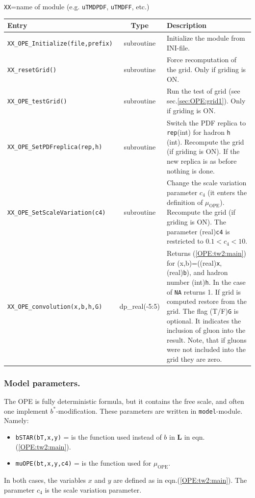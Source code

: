 \documentclass[prd,nofootinbib,eqsecnum,final]{revtex4}
\renewcommand{\(}{\left(}
\renewcommand{\)}{\right)}
\renewcommand{\[}{\left[}
\renewcommand{\]}{\right]}
\begin{document}
\begin{center}
\texttt{XX}=name of module (e.g. \texttt{uTMDPDF}, \texttt{uTMDFF}, etc.)
\\
\begin{tabular}{||p{5.5cm}||c||p{8.5cm}||}
\hline\hline
Entry &~~Type~~& Description
\\\hline
\texttt{XX\_OPE\_Initialize(file,prefix)} & subroutine & Initialize the module from INI-file.
\\\hline
\texttt{XX\_resetGrid()} & subroutine & Force recomputation of the grid. Only if griding is ON.
\\\hline
\texttt{XX\_OPE\_testGrid()} & subroutine & Run the test of grid (see sec.\ref{sec:OPE:grid1}).  Only if griding is ON.
\\\hline
\texttt{XX\_OPE\_SetPDFreplica(rep,h)} & subroutine & Switch the PDF replica to \texttt{rep}(int) for hadron \texttt{h} (int). Recompute the grid (if griding is ON). If the new replica is as before nothing is done.
\\\hline
\texttt{XX\_OPE\_SetScaleVariation(c4)} & subroutine & Change the scale variation parameter $c_4$ (it enters the definition of $\mu_{\text{OPE}}$). Recompute the grid (if griding is ON). The parameter (real)\texttt{c4} is restricted to $0.1<c_4<10$.
\\\hline\hline
\texttt{XX\_OPE\_convolution(x,b,h,G)} & dp\_real(-5:5) & Returns (\ref{OPE:tw2:main}) for (x,b)=((real)\texttt{x}, (real)\texttt{b}), and hadron number (int)\texttt{h}. In the case of \texttt{NA} returns 1. If grid is computed restore from the grid. The flag (T/F)\texttt{G} is optional. It indicates the inclusion of gluon into the result. Note, that if gluons were not included into the grid they are zero.
\\\hline\hline
\end{tabular}
\end{center}

\subsubsection{Model parameters.} 

The OPE is fully deterministic formula, but it contains the free scale, and often one implement $b^*$-modification. These parameters are written in \texttt{model}-module. Namely:
\begin{itemize}
\item \texttt{bSTAR(bT,x,y)} = is the function used instead of $b$ in  $\mathbf{L}$ in eqn.(\ref{OPE:tw2:main}).
\item \texttt{muOPE(bt,x,y,c4)} = is the function used for $\mu_{\text{OPE}}$.
\end{itemize}
In both cases, the variables $x$ and $y$ are defined as in eqn.(\ref{OPE:tw2:main}). The parameter $c_4$ is the scale variation parameter.
\end{document}
